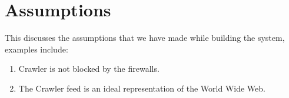 \section{Assumptions}
This discusses the assumptions that we have made while building the system, examples include:
\begin{enumerate}
	\item Crawler is not blocked by the firewalls.
	\item The Crawler feed is an ideal representation of the World Wide Web.
\end{enumerate}